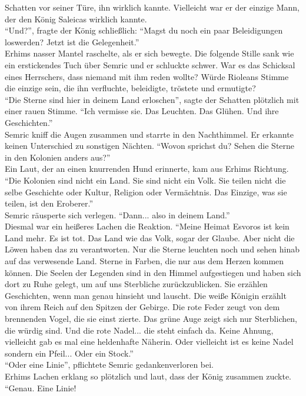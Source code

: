 Schatten vor seiner Türe, ihn wirklich kannte. Vielleicht war er der einzige Mann, der den König 
Saleicas wirklich kannte.\\
``Und?'', fragte der König schließlich: ``Magst du noch ein paar Beleidigungen loswerden? Jetzt ist 
die Gelegenheit.''\\
Erhims nasser Mantel raschelte, als er sich bewegte. Die folgende Stille sank wie ein erstickendes 
Tuch über Semric und er schluckte schwer. War es das Schicksal eines Herrschers, dass niemand mit 
ihm reden wollte? Würde Rioleans Stimme die einzige sein, die ihn verfluchte, beleidigte, tröstete 
und ermutigte? \\
``Die Sterne sind hier in deinem Land erloschen'', sagte der Schatten plötzlich mit einer rauen 
Stimme. ``Ich vermisse sie. Das Leuchten. Das Glühen. Und ihre Geschichten.''\\
Semric kniff die Augen zusammen und starrte in den Nachthimmel. Er erkannte keinen Unterschied zu 
sonstigen Nächten. ``Wovon sprichst du? Sehen die Sterne in den Kolonien anders aus?''\\
Ein Laut, der an einen knurrenden Hund erinnerte, kam aus Erhims Richtung. ``Die Kolonien sind 
nicht ein Land. Sie sind nicht ein Volk. Sie teilen nicht die selbe Geschichte oder Kultur, 
Religion oder Vermächtnis. Das Einzige, was sie teilen, ist den Eroberer.''\\
Semric räusperte sich verlegen. ``Dann... also in deinem Land.''\\
Diesmal war ein heißeres Lachen die Reaktion. ``Meine Heimat Esvoros ist kein Land mehr. Es ist 
tot. Das Land wie das Volk, sogar der Glaube. Aber nicht die Löwen haben das zu verantworten. Nur 
die Sterne leuchten noch und sehen hinab auf das verwesende Land. Sterne in Farben, die nur aus dem 
Herzen kommen können. Die Seelen der Legenden sind in den Himmel aufgestiegen und haben sich dort 
zu Ruhe gelegt, um auf uns Sterbliche zurückzublicken. Sie erzählen Geschichten, wenn man genau 
hinsieht und lauscht. Die weiße Königin erzählt von ihrem Reich auf den Spitzen der Gebirge. Die 
rote Feder zeugt von dem brennenden Vogel, die sie einst zierte. Das grüne Auge zeigt sich nur 
Sterblichen, die würdig sind. Und die rote Nadel... die steht einfach da. Keine Ahnung, vielleicht 
gab es mal eine heldenhafte Näherin. Oder vielleicht ist es keine Nadel sondern ein Pfeil... Oder 
ein Stock.''\\
``Oder eine Linie'', pflichtete Semric gedankenverloren bei.\\
Erhims Lachen erklang so plötzlich und laut, dass der König zusammen zuckte. ``Genau. Eine Linie! 
